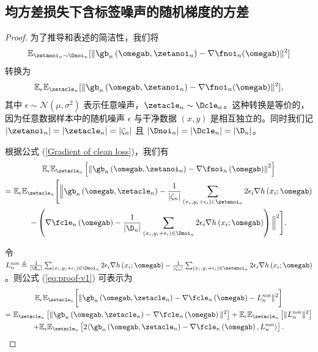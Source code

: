 \chapter{}
\section{均方差损失下含标签噪声的随机梯度的方差}\label{app:pro1}
\begin{proof}
为了推导和表述的简洁性，我们将
$$
\mathbb{E}_{\zetanoi_n\sim \Dnoi_n}[\Vert \gb_n\left(\omegab,\zetanoi_n\right) - \nabla \fnoi_n(\omegab) \Vert^2 ]
$$
转换为
$$
\mathbb{E}_\epsilon\mathbb{E}_{\zetacle_n}[\Vert \gb_n\left(\omegab,\zetanoi_n\right) - \nabla \fnoi_n(\omegab) \Vert^2 ],
$$
其中 $\epsilon\sim \mathcal{N}(\mu, \sigma^2)$ 表示任意噪声，$\zetacle_n\sim\Dcle_n$。这种转换是等价的，因为任意数据样本中的随机噪声 $\epsilon$ 与干净数据 $(x,y)$ 是相互独立的。同时我们记 $|\zetanoi_n|=|\zetacle_n|=|\zeta_n|$ 且 $|\Dnoi_n|=|\Dcle_n|=|\D_n|$。

根据公式 (\ref{Gradient of clean loss})，我们有
\begin{multline}\label{eq:proof-v1}
\mathbb{E}_\epsilon\mathbb{E}_{\zetacle_n}\left[\left\Vert \gb_n\left(\omegab,\zetanoi_n\right) - \nabla \fnoi_n\left(\omegab\right) \right\Vert^2 \right]
\\=\mathbb{E}_\epsilon\mathbb{E}_{\zetacle_n}\Biggl[\Big\Vert \gb_n\left(\omegab,\zetacle_n\right) -\frac{1}{|\zeta_n|}\sum_{\left(x_i,y_i+\epsilon_i\right)\in \zetanoi_n}2\epsilon_i\nabla h\left(x_i;\omegab\right)
\\ -\left(\nabla \fcle_n\left(\omegab\right)-\frac{1}{|\D_n|}\sum_{\left(x_i,y_i+\epsilon_i\right)\in \Dnoi_n}2\epsilon_i\nabla h\left(x_i;\omegab\right)\right)\Big\Vert^2\Biggl].
\end{multline}

令 $L_n^{noi}\triangleq\frac{1}{|\D_n|}\sum_{\left(x_i,y_i+\epsilon_i\right)\in \Dnoi_n}2\epsilon_i\nabla h\left(x_i;\omegab\right) 
-\frac{1}{|\zeta_n|}\sum_{\left(x_i,y_i+\epsilon_i\right)\in \zetanoi_n}2\epsilon_i\nabla h\left(x_i;\omegab\right)$。则公式 (\ref{eq:proof-v1}) 可表示为
\begin{multline}\label{eq:proof-v2}
    \mathbb{E}_\epsilon\mathbb{E}_{\zetacle_n}\biggl[\Vert \gb_n\left(\omegab,\zetacle_n\right)-\nabla \fcle_n\left(\omegab\right)-L_n^{noi}\Vert^2\biggl]\\=\mathbb{E}_{\zetacle_n}\left[\Vert\gb_n\left(\omegab,\zetacle_n\right)-\nabla \fcle_n\left(\omegab\right)\Vert^2\right]
    +\mathbb{E}_\epsilon\mathbb{E}_{\zetacle_n}\left[\Vert L_n^{noi}\Vert^2\right] \\
    +\mathbb{E}_\epsilon\mathbb{E}_{\zetacle_n}\left[2\langle\gb_n\left(\omegab,\zetacle_n\right)-\nabla \fcle_n\left(\omegab\right),L_n^{noi}\rangle\right].
\end{multline}


\end{proof}
